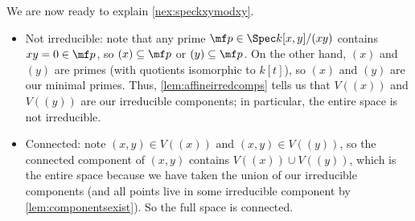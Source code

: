 \documentclass[../notes.tex]{subfiles}
\begin{document}
\begin{remark} \label{rem:explainspeckxymodxy}
	We are now ready to explain \autoref{nex:speckxymodxy}.
	\begin{itemize}
		\item Not irreducible: note that any prime $\mf p\in\Spec k[x,y]/(xy)$ contains $xy=0\in\mf p$, so $(x)\subseteq\mf p$ or $(y)\subseteq\mf p$. On the other hand, $(x)$ and $(y)$ are primes (with quotients isomorphic to $k[t]$), so $(x)$ and $(y)$ are our minimal primes. Thus, \autoref{lem:affineirredcomps} tells us that $V((x))$ and $V((y))$ are our irreducible components; in particular, the entire space is not irreducible.
		\item Connected: note $(x,y)\in V((x))$ and $(x,y)\in V((y))$, so the connected component of $(x,y)$ contains $V((x))\cup V((y))$, which is the entire space because we have taken the union of our irreducible components (and all points live in some irreducible component by \autoref{lem:componentsexist}). So the full space is connected.
	\end{itemize}
\end{remark}
\end{document}
